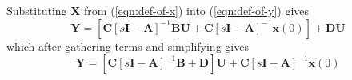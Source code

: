 Substituting $\mathbf{X}$ from (\ref{eqn:def-of-x}) into
(\ref{eqn:def-of-y}) gives
\begin{equation}\label{eqn:def-of-y2}
  \mathbf{Y}=\left[\mathbf{C}\left[s\mathbf{I}-\mathbf{A}\right]^{-1}\mathbf{B}\mathbf{U}+
  \mathbf{C}\left[s\mathbf{I}-\mathbf{A}\right]^{-1}\mathbf{x}(0)\right]+\mathbf{D}\mathbf{U}\nonumber
\end{equation}
which after gathering terms and simplifying gives
\begin{equation}\label{eqn:def-of-y3}
  \mathbf{Y}=\left[\mathbf{C}\left[s\mathbf{I}-\mathbf{A}\right]^{-1}\mathbf{B}+\mathbf{D}\right]\mathbf{U}
      +\mathbf{C}
  \left[s\mathbf{I}-\mathbf{A}\right]^{-1}\mathbf{x}(0)
  \end{equation}

\endinput

